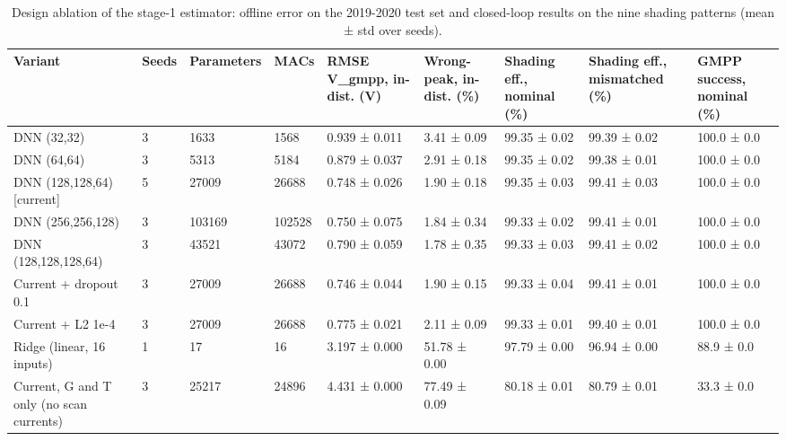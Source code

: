 \begin{table}[t]
\centering
\caption{Design ablation of the stage-1 estimator: offline error on the 2019-2020 test set and closed-loop results on the nine shading patterns (mean ± std over seeds).}
\label{tab:Table_Ablation}
\small
\begin{tabular}{lllllllll}
\hline
Variant & Seeds & Parameters & MACs & RMSE V\_gmpp, in-dist. (V) & Wrong-peak, in-dist. (\%) & Shading eff., nominal (\%) & Shading eff., mismatched (\%) & GMPP success, nominal (\%) \\
\hline
DNN (32,32) & 3 & 1633 & 1568 & 0.939 ± 0.011 & 3.41 ± 0.09 & 99.35 ± 0.02 & 99.39 ± 0.02 & 100.0 ± 0.0 \\
DNN (64,64) & 3 & 5313 & 5184 & 0.879 ± 0.037 & 2.91 ± 0.18 & 99.35 ± 0.02 & 99.38 ± 0.01 & 100.0 ± 0.0 \\
DNN (128,128,64) [current] & 5 & 27009 & 26688 & 0.748 ± 0.026 & 1.90 ± 0.18 & 99.35 ± 0.03 & 99.41 ± 0.03 & 100.0 ± 0.0 \\
DNN (256,256,128) & 3 & 103169 & 102528 & 0.750 ± 0.075 & 1.84 ± 0.34 & 99.33 ± 0.02 & 99.41 ± 0.01 & 100.0 ± 0.0 \\
DNN (128,128,128,64) & 3 & 43521 & 43072 & 0.790 ± 0.059 & 1.78 ± 0.35 & 99.33 ± 0.03 & 99.41 ± 0.02 & 100.0 ± 0.0 \\
Current + dropout 0.1 & 3 & 27009 & 26688 & 0.746 ± 0.044 & 1.90 ± 0.15 & 99.33 ± 0.04 & 99.41 ± 0.01 & 100.0 ± 0.0 \\
Current + L2 1e-4 & 3 & 27009 & 26688 & 0.775 ± 0.021 & 2.11 ± 0.09 & 99.33 ± 0.01 & 99.40 ± 0.01 & 100.0 ± 0.0 \\
Ridge (linear, 16 inputs) & 1 & 17 & 16 & 3.197 ± 0.000 & 51.78 ± 0.00 & 97.79 ± 0.00 & 96.94 ± 0.00 & 88.9 ± 0.0 \\
Current, G and T only (no scan currents) & 3 & 25217 & 24896 & 4.431 ± 0.000 & 77.49 ± 0.09 & 80.18 ± 0.01 & 80.79 ± 0.01 & 33.3 ± 0.0 \\
\hline
\end{tabular}
\end{table}
